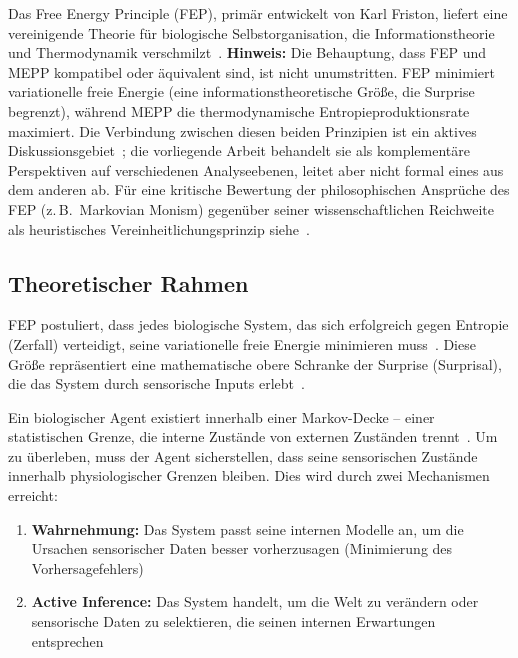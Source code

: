 \documentclass[12pt,a4paper]{article}
\theoremstyle{remark}
\begin{document}
Das Free Energy Principle (FEP), primär entwickelt von Karl Friston, liefert eine vereinigende Theorie für biologische Selbstorganisation, die Informationstheorie und Thermodynamik verschmilzt~\citep{FristonFreeEnergy,FristonPDF}. \textbf{Hinweis:} Die Behauptung, dass FEP und MEPP kompatibel oder äquivalent sind, ist nicht unumstritten. FEP minimiert variationelle freie Energie (eine informationstheoretische Größe, die Surprise begrenzt), während MEPP die thermodynamische Entropieproduktionsrate maximiert. Die Verbindung zwischen diesen beiden Prinzipien ist ein aktives Diskussionsgebiet~\citep{FristonFreeEnergy}; die vorliegende Arbeit behandelt sie als komplementäre Perspektiven auf verschiedenen Analyseebenen, leitet aber nicht formal eines aus dem anderen ab. Für eine kritische Bewertung der philosophischen Ansprüche des FEP (z.\,B.\ Markovian Monism) gegenüber seiner wissenschaftlichen Reichweite als heuristisches Vereinheitlichungsprinzip siehe~\cite{SanchezCanizares2021}.

\subsection{Theoretischer Rahmen}

FEP postuliert, dass jedes biologische System, das sich erfolgreich gegen Entropie (Zerfall) verteidigt, seine \glqq variationelle freie Energie\grqq{} minimieren muss~\citep{FristonFreeEnergy}. Diese Größe repräsentiert eine mathematische obere Schranke der \glqq Surprise\grqq{} (Surprisal), die das System durch sensorische Inputs erlebt~\citep{FristonFreeEnergy}.

Ein biologischer Agent existiert innerhalb einer \glqq Markov-Decke\grqq{} -- einer statistischen Grenze, die interne Zustände von externen Zuständen trennt~\citep{FristonPDF}. Um zu überleben, muss der Agent sicherstellen, dass seine sensorischen Zustände innerhalb physiologischer Grenzen bleiben. Dies wird durch zwei Mechanismen erreicht:

\begin{enumerate}
    \item \textbf{Wahrnehmung:} Das System passt seine internen Modelle an, um die Ursachen sensorischer Daten besser vorherzusagen (Minimierung des Vorhersagefehlers)~\citep{FristonFreeEnergy}
    \item \textbf{Active Inference:} Das System handelt, um die Welt zu verändern oder sensorische Daten zu selektieren, die seinen internen Erwartungen entsprechen~\citep{FristonFreeEnergy}
\end{enumerate}
\end{document}
